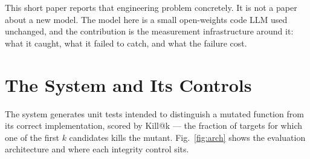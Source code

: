 \documentclass[10pt,conference]{IEEEtran}
\makeatletter
\newcommand{\killk}[1]{Kill@#1}
\makeatother
\begin{document}
This short paper reports that engineering problem concretely. It is not a paper
about a new model. The model here is a small open-weights code LLM used
unchanged, and the contribution is the measurement infrastructure around it:
what it caught, what it failed to catch, and what the failure cost.

\section{The System and Its Controls}

The system generates unit tests intended to distinguish a mutated function from
its correct implementation, scored by \killk{k} --- the fraction of targets for
which one of the first $k$ candidates kills the mutant. Fig.~\ref{fig:arch}
shows the evaluation architecture and where each integrity control sits.
\end{document}
